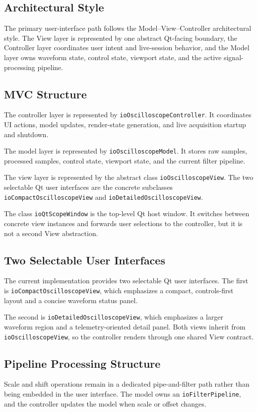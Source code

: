     \subsection{Architectural Style}
    The primary user-interface path follows the Model--View--Controller architectural style. The View layer is represented by one abstract Qt-facing boundary, the Controller layer coordinates user intent and live-session behavior, and the Model layer owns waveform state, control state, viewport state, and the active signal-processing pipeline.

    \subsection{MVC Structure}
    The controller layer is represented by \texttt{ioOscilloscopeController}. It coordinates UI actions, model updates, render-state generation, and live acquisition startup and shutdown.

    The model layer is represented by \texttt{ioOscilloscopeModel}. It stores raw samples, processed samples, control state, viewport state, and the current filter pipeline.

    The view layer is represented by the abstract class \texttt{ioOscilloscopeView}. The two selectable Qt user interfaces are the concrete subclasses \texttt{ioCompactOscilloscopeView} and \texttt{ioDetailedOscilloscopeView}.

    The class \texttt{ioQtScopeWindow} is the top-level Qt host window. It switches between concrete view instances and forwards user selections to the controller, but it is not a second View abstraction.

    \subsection{Two Selectable User Interfaces}
    The current implementation provides two selectable Qt user interfaces. The first is \texttt{ioCompactOscilloscopeView}, which emphasizes a compact, controls-first layout and a concise waveform status panel.

    The second is \texttt{ioDetailedOscilloscopeView}, which emphasizes a larger waveform region and a telemetry-oriented detail panel. Both views inherit from \texttt{ioOscilloscopeView}, so the controller renders through one shared View contract.

    \subsection{Pipeline Processing Structure}
    Scale and shift operations remain in a dedicated pipe-and-filter path rather than being embedded in the user interface. The model owns an \texttt{ioFilterPipeline}, and the controller updates the model when scale or offset changes.

